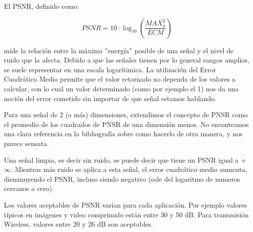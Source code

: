 El PSNR, definido como:

$$
\mathit{PSNR} = 10 \cdot \log_{10} \left( \frac{\mathit{MAX}^2_x}{\mathit{ECM}}
\right)
$$

mide la relaci\'on entre la m\'axima ''energ\'ia'' posible de una se\~nal y el
nivel de ruido que la afecta. Debido a que las se\~nales tienen por lo general rangos
amplios, se suele representar en una escala logar\'itimica. La utilizaci\'on del
 Error Cuadr\'atico Medio permite que el valor retornado no dependa de los
valores a calcular, con lo cual un valor determinado (como por ejemplo el 1) nos
da una noci\'on del error cometido sin importar de que se\~nal estamos hablando.


Para una se\~nal de 2 (o m\'as) dimensiones, extendimos el concepto de PNSR como
el promedio de los cuadrados de PNSR de una dimensi\'on menos. No encontramos una clara
referencia en la bibliograf\'ia sobre como hacerlo de otra manera, y nos parece sensata.

Una se\~nal limpia, es decir sin ruido, se puede decir que tiene un PSNR igual a
+$\infty$. Mientras m\'as ruido se aplica a esta se\~nal, el error cuadr\'atico
medio aumenta, disminuyendo el PSNR, incluso siendo negativo (sale del logaritmo
de numeros cercanos a cero).

Los valores aceptables de PSNR var\'ian para cada aplicaci\'on. Por ejemplo valores t\'ipicos en
im\'agenes y video comprimido est\'an entre 30 y 50 dB. Para transmisi\'on
Wireless, valores entre 20 y 26 dB son aceptables. 
